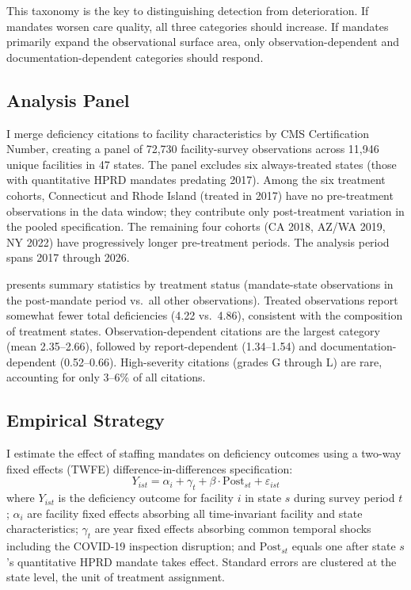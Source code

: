\documentclass[12pt]{article}
\begin{document}
This taxonomy is the key to distinguishing detection from deterioration. If mandates worsen care quality, all three categories should increase. If mandates primarily expand the observational surface area, only observation-dependent and documentation-dependent categories should respond.

\subsection{Analysis Panel}

I merge deficiency citations to facility characteristics by CMS Certification Number, creating a panel of 72,730 facility-survey observations across 11,946 unique facilities in 47 states. The panel excludes six always-treated states (those with quantitative HPRD mandates predating 2017). Among the six treatment cohorts, Connecticut and Rhode Island (treated in 2017) have no pre-treatment observations in the data window; they contribute only post-treatment variation in the pooled specification. The remaining four cohorts (CA 2018, AZ/WA 2019, NY 2022) have progressively longer pre-treatment periods. The analysis period spans 2017 through 2026.



 presents summary statistics by treatment status (mandate-state observations in the post-mandate period vs.\ all other observations). Treated observations report somewhat fewer total deficiencies (4.22 vs.\ 4.86), consistent with the composition of treatment states. Observation-dependent citations are the largest category (mean 2.35--2.66), followed by report-dependent (1.34--1.54) and documentation-dependent (0.52--0.66). High-severity citations (grades G through L) are rare, accounting for only 3--6\% of all citations.

\subsection{Empirical Strategy}

I estimate the effect of staffing mandates on deficiency outcomes using a two-way fixed effects (TWFE) difference-in-differences specification:
\begin{equation}
Y_{ist} = \alpha_i + \gamma_t + \beta \cdot \text{Post}_{st} + \varepsilon_{ist}
\label{eq:twfe}
\end{equation}
where $Y_{ist}$ is the deficiency outcome for facility $i$ in state $s$ during survey period $t$; $\alpha_i$ are facility fixed effects absorbing all time-invariant facility and state characteristics; $\gamma_t$ are year fixed effects absorbing common temporal shocks including the COVID-19 inspection disruption; and $\text{Post}_{st}$ equals one after state $s$'s quantitative HPRD mandate takes effect. Standard errors are clustered at the state level, the unit of treatment assignment.
\end{document}
